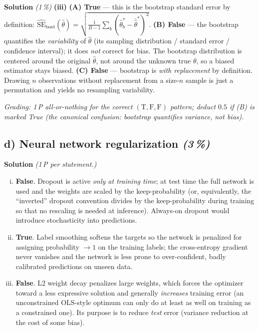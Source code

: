 \documentclass[11pt,a4paper]{article}
\newcommand{\subpoints}[1]{\textit{(#1\,\%)}}
\newcommand{\sol}{\noindent\textbf{Solution}}
\begin{document}
\medskip
\sol{} \subpoints{1} \textbf{(iii)} \textbf{(A) True} --- this is the bootstrap standard error by
definition: $\widehat{\mathrm{SE}}_{\mathrm{boot}}(\hat\theta) = \sqrt{\tfrac{1}{B-1}\sum_b(\hat\theta^*_b - \bar{\hat\theta}^*)^2}$.
\textbf{(B) False} --- the bootstrap quantifies the \emph{variability} of $\hat\theta$ (its
sampling distribution / standard error / confidence interval); it does \emph{not} correct for bias.
The bootstrap distribution is centered around the original $\hat\theta$, not around the unknown
true $\theta$, so a biased estimator stays biased.
\textbf{(C) False} --- bootstrap is \emph{with replacement} by definition. Drawing $n$ observations
without replacement from a size-$n$ sample is just a permutation and yields no resampling
variability.

\noindent\emph{Grading: 1\,P all-or-nothing for the correct $(\mathrm{T}, \mathrm{F}, \mathrm{F})$ pattern; deduct
$0.5$ if (B) is marked True (the canonical confusion: bootstrap quantifies variance, not bias).}

\subsection*{d) Neural network regularization \subpoints{3}}
\sol{} \emph{(1\,P per statement.)}
\begin{enumerate}[(i)]
  \item \textbf{False}. Dropout is active \emph{only at training time}; at test time the full
        network is used and the weights are scaled by the keep-probability (or, equivalently, the
        ``inverted'' dropout convention divides by the keep-probability during training so that no
        rescaling is needed at inference). Always-on dropout would introduce stochasticity into
        predictions.
  \item \textbf{True}. Label smoothing softens the targets so the network is penalized for
        assigning probability $\to 1$ on the training labels; the cross-entropy gradient never
        vanishes and the network is less prone to over-confident, badly calibrated predictions on
        unseen data.
  \item \textbf{False}. L2 weight decay penalizes large weights, which forces the optimizer toward
        a less expressive solution and generally \emph{increases} training error (an unconstrained
        OLS-style optimum can only do at least as well on training as a constrained one). Its
        purpose is to reduce \emph{test} error (variance reduction at the cost of some bias).
\end{enumerate}
\end{document}
